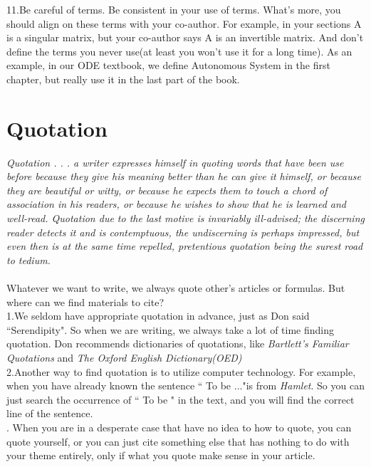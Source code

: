 \documentclass[]{article}
\begin{document}
	\noindent11.Be careful of terms. Be consistent in your use of terms. What's more, you should align on these terms with your co-author. For example, in your sections A is a singular matrix, but your co-author says A is an invertible matrix. And don't define the terms you never use(at least you won't use it for a long time). As an example, in our ODE textbook, we define Autonomous System in the first chapter, but really use it in the last part of the book.\\
	
	\section{Quotation}
	\textit{Quotation . . . a writer expresses himself in quoting words that have been use
	before because they give his meaning better than he can give it himself, or because
	they are beautiful or witty, or because he expects them to touch a chord of
	association in his readers, or because he wishes to show that he is learned and
	well-read. Quotation due to the last motive is invariably ill-advised; the discerning
	reader detects it and is contemptuous, the undiscerning is perhaps impressed, but
	even then is at the same time repelled, pretentious quotation being the surest road
	to tedium.}\\ \\ 
	
	
	\noindent Whatever we want to write, we always quote other's articles or formulas. But where can we find materials to cite?\\  
	
	\noindent 1.We seldom have appropriate quotation in advance, just as Don said ``Serendipity". So when we are writing, we always take a lot of time finding quotation. Don recommends dictionaries of quotations, like \textit{Bartlett's Familiar Quotations} and \textit{The Oxford English Dictionary(OED)}\\
	
	\noindent 2.Another way to find quotation is to utilize computer technology. For example, when you have already known the sentence `` To be ..."is from \textit{Hamlet}. So you can just search the occurrence of `` To be " in the text, and you will find the correct line of the sentence.\\
	
	. When you are in a desperate case that have no idea to how to quote, you can quote yourself, or you can just cite something else that has nothing to do with your theme entirely, only if what you quote make sense in your article.  \\
	
\end{document}
